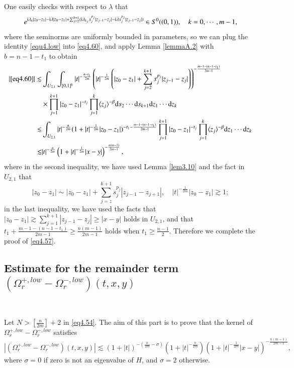 \documentclass[11pt,reqno]{amsart}
\def\d{{\rm d}}
\def\i{{\rm i}}
\numberwithin{equation}{section}
\theoremstyle{definition}
\begin{document}
One easily checks with respect to $\lambda$ that
$$
e^{\i\lambda_{k}|z_{0}-z_{1}|-\i\lambda|z_{0}-z_{1}|+\sum_{j=2}^{k+1}
(\i\lambda_{k_{j}}s_{j}^{p_{j}}|z_{j-1}-z_{j}|-\i\lambda s_{j}^{p_{j}}|z_{j-1}-z_{j}|)}\in S^{0}((0,1)),\quad k=0,\cdots,m-1,
$$	
where the seminorms are uniformly bounded in parameters, so we can plug the identity \eqref{equ4.low} into \eqref{eq4.60}, and apply Lemma \ref{lemmaA.2} with $b=n-1-t_1$ to obtain
\begin{equation*}\label{eq4.61}
\begin{split} |\eqref{eq4.60}|\lesssim&\int_{U_{2, 1}}\int_{[0,1]^k}|t|^{-\frac{n-t_1}{2m}}\left(|t|^{-\frac{1}{2m}}\left(|z_{0}-z_{1}|+\sum_{j=2}^{k+1}s_{j}^{p_{j}}|z_{j-1}-z_{j}|\right)\right)^{-\frac{m-1-(n-1-t_{1})}{2m-1}}\\
	&\times\prod_{j=1}^{k+1}|z_{0}-z_{1}|^{-t_{j}}\prod_{j=1}^{k}\langle z_{j}\rangle^{-\beta}\d s_{2}\cdots \d s_{k+1}\d z_{1}\cdots \d z_{k}\\
	\lesssim& \int_{U_{2, 1}} |t|^{-\frac{n}{2m}}(1+|t|^{-\frac{1}{2m}}|z_{0}-z_{1}|)^{-t_1-\frac{m-1-(n-1-t_{1})}{2m-1}}\prod_{j=1}^{k+1}|z_{0}-z_{1}|^{-t_{j}}\prod_{j=1}^{k}\langle z_{j}\rangle^{-\beta}\d z_{1}\cdots \d z_{k}\\
	\lesssim& |t|^{-\frac{n}{2m}}\left(1+|t|^{-\frac{1}{2m}}|x-y|\right)^{-\frac{n(m-1)}{2m-1}},
\end{split}
\end{equation*}
where in the second inequality, we have used Lemma \ref{lem3.10} and the fact in $U_{2, 1}$ that
$$|z_{0}-z_{1}|\sim|z_{0}-z_{1}|+\sum_{j=z}^{k+1}s_{j}^{p_{j}}|z_{j-1}-z_{j+1}|,\quad|t|^{-\frac{1}{2m}}|z_{0}-z_{1}|\gtrsim1;$$
in the last inequality, we have used the facts that
$|z_{0}-z_{1}|\gtrsim \sum_{j=1}^{k+1}{|z_{j-1}-z_j|}\ge |x-y|$ holds in $U_{2, 1}$, and that $t_1+\frac{m-1-(n-1-t_{1})}{2m-1}\ge \frac{n(m-1)}{2m-1}$ holds when $t_1\ge \frac{n-1}{2}$. Therefore we complete the proof of \eqref{eq4.57}.


\subsection{Estimate for the remainder term $(\Omega_{r}^{+, low}-\Omega_{r}^{-, low})(t,x,y)$}\label{sec4.2.4}\

Let $N>[\frac{n}{2m}]+2$ in \eqref{eq4.54}. The aim of this part is to prove that the kernel of $\Omega_{r}^{+, low}-\Omega_{r}^{-, low}$ satisfies
\begin{equation}\label{equ-ker-remai}
	\left|(\Omega_{r}^{+, low}-\Omega_{r}^{-, low})(t,x,y)\right| \lesssim (1+|t|)^{-(\frac{n}{2m}-\sigma)}(1+|t|^{-\frac{n}{2 m}})\left(1+|t|^{-\frac{1}{2 m}}|x-y|\right)^{-\frac{n(m-1)}{2 m-1}},
\end{equation}
where $\sigma=0$ if zero is not an  eigenvalue of $H$, and $\sigma=2$ otherwise.
\end{document}
